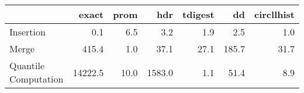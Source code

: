 \begin{tabular}{lrrrrrr}
\toprule
{} &   exact &  prom &    hdr &  tdigest &    dd &  circllhist \\
\midrule
Insertion            &     0.1 &   6.5 &    3.2 &      1.9 &   2.5 &         1.0 \\
Merge                &   415.4 &   1.0 &   37.1 &     27.1 & 185.7 &        31.7 \\
Quantile Computation & 14222.5 &  10.0 & 1583.0 &      1.1 &  51.4 &         8.9 \\
\bottomrule
\end{tabular}
